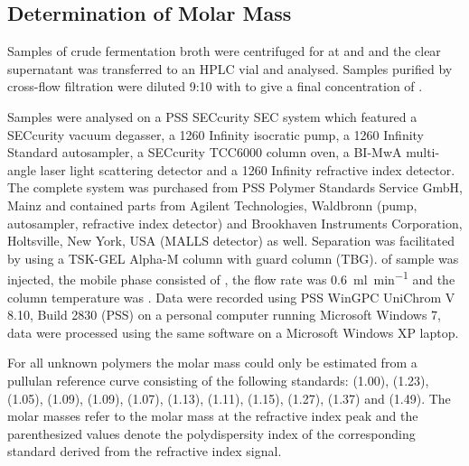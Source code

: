 \subsection{Determination of Molar Mass}
Samples of crude fermentation broth were centrifuged for  at  and  and the clear supernatant was transferred to an HPLC vial and analysed. Samples purified by cross-flow filtration were diluted 9:10 with   to give a final  concentration of .

Samples were analysed on a PSS SECcurity SEC system which featured a SECcurity vacuum degasser, a 1260 Infinity isocratic pump, a 1260 Infinity Standard autosampler, a SECcurity TCC6000 column oven, a BI-MwA multi-angle laser light scattering detector and a 1260 Infinity refractive index detector. The complete system was purchased from PSS Polymer Standards Service GmbH, Mainz and contained parts from Agilent Technologies, Waldbronn (pump, autosampler, refractive index detector) and Brookhaven Instruments Corporation, Holtsville, New York, USA (MALLS detector) as well. Separation was facilitated by using a TSK-GEL Alpha-M column with guard column (TBG).  of sample was injected, the mobile phase consisted of  , the flow rate was \SI{0.6}{\milli\litre\per\minute} and the column temperature was . Data were recorded using PSS WinGPC UniChrom V 8.10, Build 2830 (PSS) on a personal computer running Microsoft Windows 7, data were processed using the same software on a Microsoft Windows XP laptop.

For all unknown polymers the molar mass could only be estimated from a pullulan reference curve consisting of the following standards:  (\num{1.00}),  (\num{1.23}),  (\num{1.05}),  (\num{1.09}),  (\num{1.09}),  (\num{1.07}),  (\num{1.13}),  (\num{1.11}),  (\num{1.15}),  (\num{1.27}),  (\num{1.37}) and  (\num{1.49}). The molar masses refer to the molar mass at the refractive index peak and the parenthesized values denote the polydispersity index of the corresponding standard derived from the refractive index signal.

